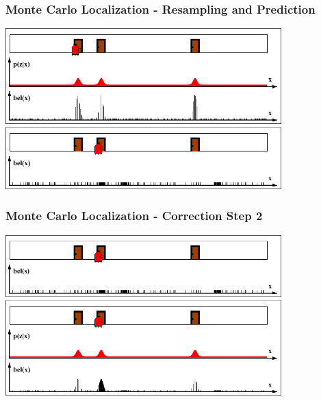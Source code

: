 \begin{frame}
    \frametitle{Monte Carlo Localization - Resampling and Prediction}
    
    \begin{center}
        \includegraphics[width=0.8\textwidth]{./images/particle_filter/monte_carlo_resample_and_predict.pdf}
    \end{center}
    
\end{frame}
    
\begin{frame}
    \frametitle{Monte Carlo Localization - Correction Step 2}
    
    \begin{center}
        \includegraphics[width=0.8\textwidth]{./images/particle_filter/monte_carlo_correction2.pdf}
    \end{center}
    
\end{frame}
    
